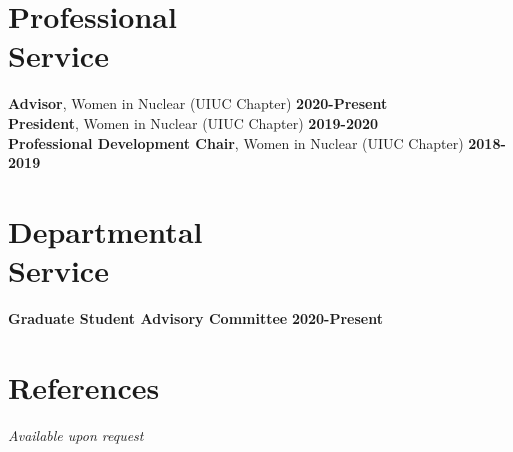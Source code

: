 \documentclass[margin,line]{resume}
\begin{document}
\begin{resume}
    \section{\mysidestyle Professional\\Service}
                \textbf{Advisor}, Women in Nuclear (UIUC Chapter) \hfill \textbf{2020-Present}\vspace{.5mm}\\%
                \textbf{President}, Women in Nuclear (UIUC Chapter) \hfill \textbf{2019-2020}\vspace{.5mm}\\%
                \textbf{Professional Development Chair}, Women in Nuclear (UIUC Chapter) \hfill \textbf{2018-2019}\\%
                \vspace{-0.5cm}
    \section{\mysidestyle Departmental\\Service}
		\textbf{Graduate Student Advisory Committee} \hfill \textbf{2020-Present}\\%

\vspace{-0.3cm}

\section{\mysidestyle References}
\textsl{Available upon request}



\end{resume}
\end{document}
